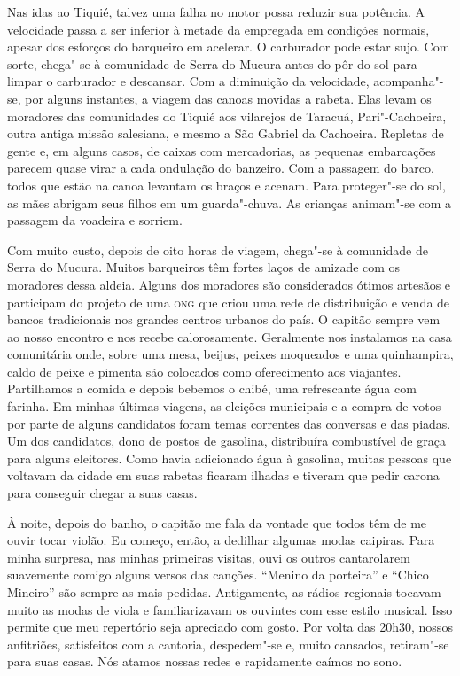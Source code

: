 Nas idas ao Tiquié, talvez uma falha no motor possa reduzir sua
potência. A velocidade passa a ser inferior à metade da empregada em
condições normais, apesar dos esforços do barqueiro em acelerar. O
carburador pode estar sujo. Com sorte, chega"-se à comunidade de Serra do
Mucura antes do pôr do sol para limpar o carburador e descansar. Com a
diminuição da velocidade, acompanha"-se, por alguns instantes, a viagem
das canoas movidas a rabeta. Elas levam os moradores das comunidades do
Tiquié aos vilarejos de Taracuá, Pari"-Cachoeira, outra antiga missão
salesiana, e mesmo a São Gabriel da Cachoeira. Repletas de gente e, em
alguns casos, de caixas com mercadorias, as pequenas embarcações parecem
quase virar a cada ondulação do banzeiro. Com a passagem do barco, todos
que estão na canoa levantam os braços e acenam. Para proteger"-se do sol,
as mães abrigam seus filhos em um guarda"-chuva. As crianças animam"-se
com a passagem da voadeira e sorriem.

Com muito custo, depois de oito horas de viagem, chega"-se à comunidade
de Serra do Mucura. Muitos barqueiros têm fortes laços de amizade com os
moradores dessa aldeia. Alguns dos moradores são considerados ótimos
artesãos e participam do projeto de uma {\textsc{ong}} que criou uma rede de
distribuição e venda de bancos tradicionais nos grandes centros urbanos
do país. O capitão sempre vem ao nosso encontro e nos recebe
calorosamente. Geralmente nos instalamos na casa comunitária onde, sobre
uma mesa, beijus, peixes moqueados e uma quinhampira, caldo de peixe e
pimenta são colocados como oferecimento aos viajantes. Partilhamos a
comida e depois bebemos o chibé, uma refrescante água com farinha. Em
minhas últimas viagens, as eleições municipais e a compra de votos por
parte de alguns candidatos foram temas correntes das conversas e das
piadas. Um dos candidatos, dono de postos de gasolina, distribuíra
combustível de graça para alguns eleitores. Como havia adicionado água à
gasolina, muitas pessoas que voltavam da cidade em suas rabetas ficaram
ilhadas e tiveram que pedir carona para conseguir chegar a suas casas.

À noite, depois do banho, o capitão me fala da vontade que todos têm de
me ouvir tocar violão. Eu começo, então, a dedilhar algumas modas
caipiras. Para minha surpresa, nas minhas primeiras visitas, ouvi os
outros cantarolarem suavemente comigo alguns versos das canções.
``Menino da porteira'' e ``Chico Mineiro'' são sempre as mais pedidas.
Antigamente, as rádios regionais tocavam muito as modas de viola e
familiarizavam os ouvintes com esse estilo musical. Isso permite que meu
repertório seja apreciado com gosto. Por volta das 20h30, nossos
anfitriões, satisfeitos com a cantoria, despedem"-se e, muito cansados,
retiram"-se para suas casas. Nós atamos nossas redes e rapidamente caímos
no sono.


